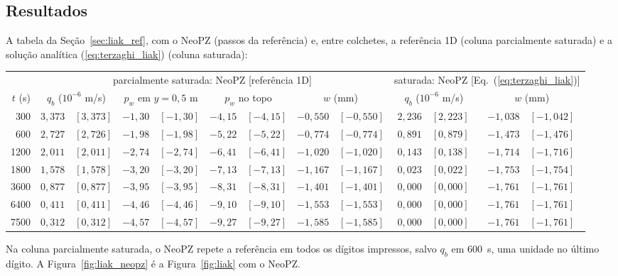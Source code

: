 \documentclass[11pt,a4paper]{article}
\begin{document}
\subsection{Resultados}
\label{sec:liak_resultados}

A tabela da Seção~\ref{sec:liak_ref}, com o NeoPZ (passos da referência) e, entre colchetes, a
referência 1D (coluna parcialmente saturada) e a solução analítica (\ref{eq:terzaghi_liak})
(coluna saturada):

\begin{center}\footnotesize
\setlength{\tabcolsep}{2.6pt}
\begin{tabular}{@{}r rl rl rl rl rl rl@{}}
\toprule
& \multicolumn{8}{c}{parcialmente saturada: NeoPZ [referência 1D]} &
  \multicolumn{4}{c}{saturada: NeoPZ [Eq.~(\ref{eq:terzaghi_liak})]}\\
\cmidrule(lr){2-9}\cmidrule(l){10-13}
$t$ (s) & \multicolumn{2}{c}{$q_b$ ($10^{-6}$ m/s)} & \multicolumn{2}{c}{$p_w$ em $y=0{,}5$ m} &
  \multicolumn{2}{c}{$p_w$ no topo} & \multicolumn{2}{c}{$w$ (mm)} &
  \multicolumn{2}{c}{$q_b$ ($10^{-6}$ m/s)} & \multicolumn{2}{c}{$w$ (mm)}\\
\midrule
300 & $3{,}373$ & $[3{,}373]$ & $-1{,}30$ & $[-1{,}30]$ & $-4{,}15$ & $[-4{,}15]$ & $-0{,}550$ & $[-0{,}550]$ & $2{,}236$ & $[2{,}223]$ & $-1{,}038$ & $[-1{,}042]$\\
600 & $2{,}727$ & $[2{,}726]$ & $-1{,}98$ & $[-1{,}98]$ & $-5{,}22$ & $[-5{,}22]$ & $-0{,}774$ & $[-0{,}774]$ & $0{,}891$ & $[0{,}879]$ & $-1{,}473$ & $[-1{,}476]$\\
1200 & $2{,}011$ & $[2{,}011]$ & $-2{,}74$ & $[-2{,}74]$ & $-6{,}41$ & $[-6{,}41]$ & $-1{,}020$ & $[-1{,}020]$ & $0{,}143$ & $[0{,}138]$ & $-1{,}714$ & $[-1{,}716]$\\
1800 & $1{,}578$ & $[1{,}578]$ & $-3{,}20$ & $[-3{,}20]$ & $-7{,}13$ & $[-7{,}13]$ & $-1{,}167$ & $[-1{,}167]$ & $0{,}023$ & $[0{,}022]$ & $-1{,}753$ & $[-1{,}754]$\\
3600 & $0{,}877$ & $[0{,}877]$ & $-3{,}95$ & $[-3{,}95]$ & $-8{,}31$ & $[-8{,}31]$ & $-1{,}401$ & $[-1{,}401]$ & $0{,}000$ & $[0{,}000]$ & $-1{,}761$ & $[-1{,}761]$\\
6400 & $0{,}411$ & $[0{,}411]$ & $-4{,}46$ & $[-4{,}46]$ & $-9{,}10$ & $[-9{,}10]$ & $-1{,}553$ & $[-1{,}553]$ & $0{,}000$ & $[0{,}000]$ & $-1{,}761$ & $[-1{,}761]$\\
7500 & $0{,}312$ & $[0{,}312]$ & $-4{,}57$ & $[-4{,}57]$ & $-9{,}27$ & $[-9{,}27]$ & $-1{,}585$ & $[-1{,}585]$ & $0{,}000$ & $[0{,}000]$ & $-1{,}761$ & $[-1{,}761]$\\
\bottomrule
\end{tabular}
\end{center}
Na coluna parcialmente saturada, o NeoPZ repete a referência em todos os dígitos impressos, salvo
$q_b$ em 600~s, uma unidade no último dígito. A Figura~\ref{fig:liak_neopz} é a
Figura~\ref{fig:liak} com o NeoPZ.
\end{document}

